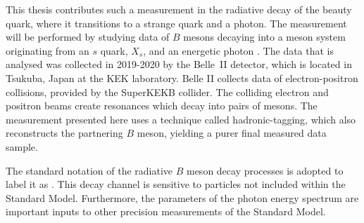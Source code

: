 This thesis contributes such a measurement in the radiative decay of the beauty quark, where it transitions to a strange quark and a photon.
The measurement will be performed by studying data of $B$ mesons decaying into a meson system originating from an $s$ quark, $X_s$, and an energetic photon \g.
The data that is analysed was collected in 2019-2020 by the Belle~II detector, which is located in Tsukuba, Japan at the KEK laboratory.
Belle II collects data of electron-positron collisions, provided by the SuperKEKB collider.
The colliding electron and positron beams create \FourS resonances which decay into pairs of \B mesons.
The measurement presented here uses a technique called hadronic-tagging, 
which also reconstructs the partnering $B$ meson, yielding a purer final measured data sample.

The standard notation of the radiative $B$ meson decay processes is adopted to label it as \BtoXsgamma.
This decay channel is sensitive to particles not included within the Standard Model. 
Furthermore, the parameters of the photon energy spectrum are important inputs to other precision measurements of the Standard Model.


